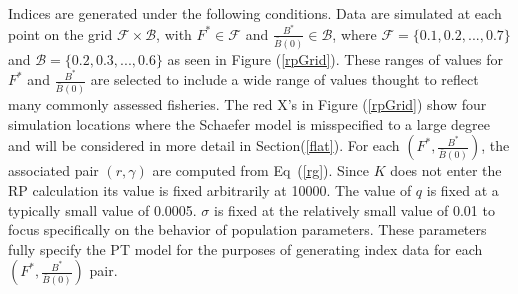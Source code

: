 \documentclass[12pt]{article}
\begin{document}
%
Indices are generated under the following conditions. Data are simulated at
each point on the grid $\mathcal{F}\times\mathcal{B}$, with $F^*\in\mathcal{F}$ 
and $\frac{B^*}{\bar B(0)}\in\mathcal{B}$, where $\mathcal{F}=\{0.1, 0.2, ..., 0.7\}$ 
and $\mathcal{B}=\{0.2, 0.3, ..., 0.6\}$ as seen in Figure (\ref{rpGrid}).  
These ranges of values for $F^*$ and $\frac{B^*}{\bar B(0)}$ are selected to 
include a wide range of values thought to reflect many commonly assessed fisheries.
The red X's in Figure (\ref{rpGrid}) show four simulation locations where the 
Schaefer model is misspecified to a large degree and will be considered in more 
detail in Section(\ref{flat}). For each $\left(F^*, \frac{B^*}{\bar B(0)}\right)$, 
the associated pair $(r, \gamma)$ are computed from \mbox{Eq (\ref{rg}).} Since $K$ 
does not enter the RP calculation its value is fixed arbitrarily at 10000.  %
The value of $q$ is fixed at a typically small value of 0.0005. $\sigma$ is 
fixed at the relatively small value of 0.01 to focus specifically on the 
behavior of population parameters. These parameters fully specify the PT 
model for the purposes of generating index data for each $\left(F^*, \frac{B^*}{\bar B(0)}\right)$ pair.
\end{document}
